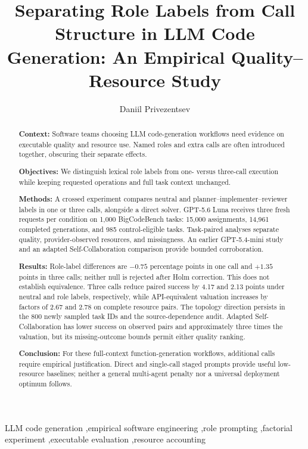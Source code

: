 \documentclass[preprint,12pt,nopreprintline]{elsarticle}
\begin{document}
\begin{frontmatter}
\title{Separating Role Labels from Call Structure in LLM Code Generation: An Empirical Quality--Resource Study}
\author[hse]{Daniil Privezentsev}
\address[hse]{National Research University Higher School of Economics, 20 Myasnitskaya Ulitsa, Moscow 101000, Russia}

\begin{abstract}
\textbf{Context:} Software teams choosing LLM code-generation workflows need evidence on executable quality and resource use. Named roles and extra calls are often introduced together, obscuring their separate effects.

\textbf{Objectives:} We distinguish lexical role labels from one- versus three-call execution while keeping requested operations and full task context unchanged.

\textbf{Methods:} A crossed experiment compares neutral and planner--implementer--reviewer labels in one or three calls, alongside a direct solver. GPT-5.6 Luna receives three fresh requests per condition on 1,000 BigCodeBench tasks: 15,000 assignments, 14,961 completed generations, and 985 control-eligible tasks. Task-paired analyses separate quality, provider-observed resources, and missingness. An earlier GPT-5.4-mini study and an adapted Self-Collaboration comparison provide bounded corroboration.

\textbf{Results:} Role-label differences are $-0.75$ percentage points in one call and $+1.35$ points in three calls; neither null is rejected after Holm correction. This does not establish equivalence. Three calls reduce paired success by 4.17 and 2.13 points under neutral and role labels, respectively, while API-equivalent valuation increases by factors of 2.67 and 2.78 on complete resource pairs. The topology direction persists in the 800 newly sampled task IDs and the source-dependence audit. Adapted Self-Collaboration has lower success on observed pairs and approximately three times the valuation, but its missing-outcome bounds permit either quality ranking.

\textbf{Conclusion:} For these full-context function-generation workflows, additional calls require empirical justification. Direct and single-call staged prompts provide useful low-resource baselines; neither a general multi-agent penalty nor a universal deployment optimum follows.
\end{abstract}
\begin{keyword}
LLM code generation \sep empirical software engineering \sep role prompting \sep factorial experiment \sep executable evaluation \sep resource accounting
\end{keyword}
\end{frontmatter}



\end{document}
